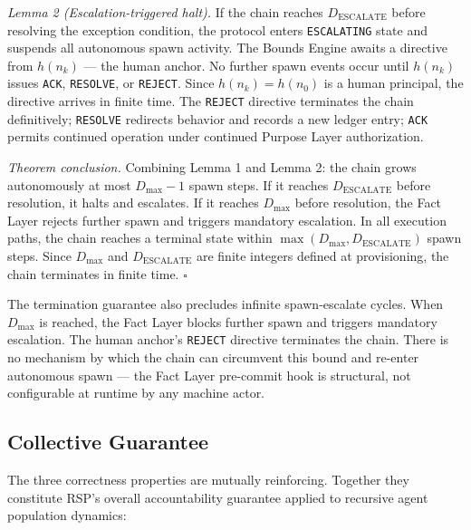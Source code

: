 \medskip
\textit{Lemma 2 (Escalation-triggered halt).} If the chain reaches $D_{\mathrm{ESCALATE}}$ before resolving the exception condition, the protocol enters \texttt{ESCALATING} state and suspends all autonomous spawn activity. The Bounds Engine awaits a directive from $h(n_k)$ — the human anchor. No further spawn events occur until $h(n_k)$ issues \texttt{ACK}, \texttt{RESOLVE}, or \texttt{REJECT}. Since $h(n_k) = h(n_0)$ is a human principal, the directive arrives in finite time. The \texttt{REJECT} directive terminates the chain definitively; \texttt{RESOLVE} redirects behavior and records a new ledger entry; \texttt{ACK} permits continued operation under continued Purpose Layer authorization.

\medskip
\textit{Theorem conclusion.} Combining Lemma 1 and Lemma 2: the chain grows autonomously at most $D_{\mathrm{max}} - 1$ spawn steps. If it reaches $D_{\mathrm{ESCALATE}}$ before resolution, it halts and escalates. If it reaches $D_{\mathrm{max}}$ before resolution, the Fact Layer rejects further spawn and triggers mandatory escalation. In all execution paths, the chain reaches a terminal state within $\max(D_{\mathrm{max}}, D_{\mathrm{ESCALATE}})$ spawn steps. Since $D_{\mathrm{max}}$ and $D_{\mathrm{ESCALATE}}$ are finite integers defined at provisioning, the chain terminates in finite time. $\square$

The termination guarantee also precludes infinite spawn-escalate cycles. When $D_{\mathrm{max}}$ is reached, the Fact Layer blocks further spawn and triggers mandatory escalation. The human anchor's \texttt{REJECT} directive terminates the chain. There is no mechanism by which the chain can circumvent this bound and re-enter autonomous spawn — the Fact Layer pre-commit hook is structural, not configurable at runtime by any machine actor.

\subsection{Collective Guarantee}
\label{sec:rs-collective-guarantee}

The three correctness properties are mutually reinforcing. Together they constitute RSP's overall accountability guarantee applied to recursive agent population dynamics:

